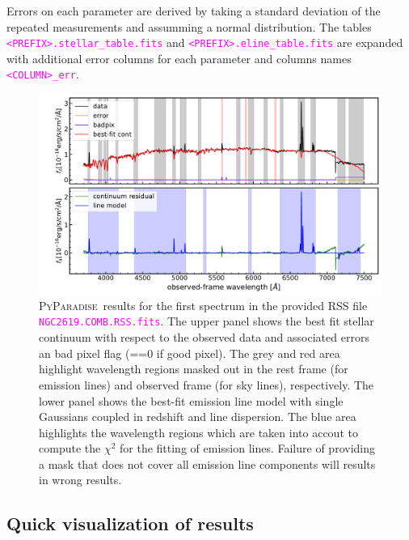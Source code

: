 \documentclass[usenatbib,usegraphicx,useAMS,onecolumn]{mn2e}
\newcommand{\codeline}[1]{\lstinline|#1|}
\newcommand{\fname}[1]{\textcolor{magenta}{\codeline{#1}}}
\newcommand{\PyPar}{\mbox{\textsc{PyParadise}}}
\begin{document}
Errors on each parameter are derived by taking a standard deviation of the repeated measurements and assumming a normal distribution. The tables \fname{<PREFIX>.stellar_table.fits} and \fname{<PREFIX>.eline_table.fits} are expanded with additional error columns for each parameter and columns names \fname{<COLUMN>_err}. 

\begin{figure}
 \includegraphics[width=\textwidth]{figs/example_spec/NGC2619_COMB_RSS_0.pdf}
  \caption{\PyPar\ results for the first spectrum in the provided RSS file \fname{NGC2619.COMB.RSS.fits}. The upper panel shows the best fit stellar continuum with respect to the observed data and associated errors an bad pixel flag (==0 if good pixel). The grey and red area highlight wavelength regions masked out in the rest frame (for emission lines) and observed frame (for sky lines), respectively. The lower panel shows the best-fit emission line model with single Gaussians coupled in redshift and line dispersion. The blue area highlights the wavelength regions which are taken into accout to compute the $\chi^2$ for the fitting of emission lines. Failure of providing a mask that does not cover all emission line components will results in wrong results.}\label{fig:NGC2691_example}
\end{figure}


\subsection{Quick visualization of results}
\end{document}
